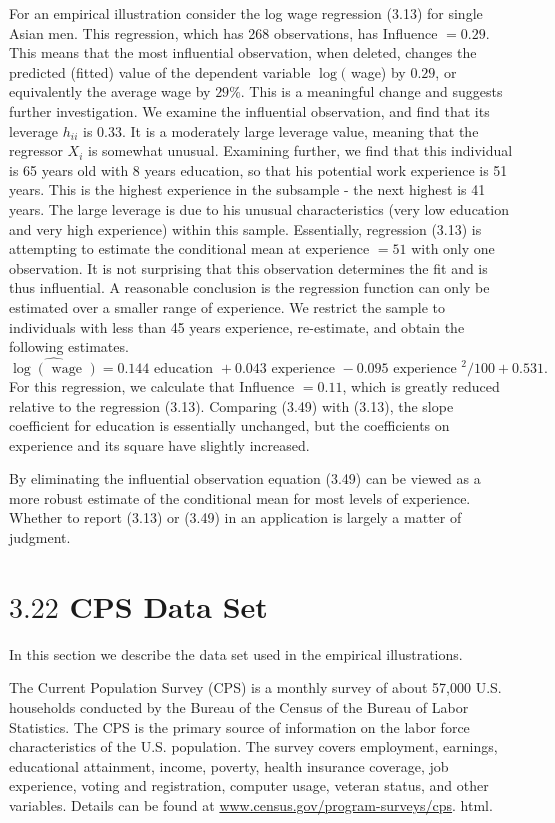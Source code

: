 \documentclass[10pt]{article}
\begin{document}
For an empirical illustration consider the log wage regression (3.13) for single Asian men. This regression, which has 268 observations, has Influence $=0.29$. This means that the most influential observation, when deleted, changes the predicted (fitted) value of the dependent variable $\log ($ wage) by $0.29$, or equivalently the average wage by $29 \%$. This is a meaningful change and suggests further investigation. We examine the influential observation, and find that its leverage $h_{i i}$ is $0.33$. It is a moderately large leverage value, meaning that the regressor $X_{i}$ is somewhat unusual. Examining further, we find that this individual is 65 years old with 8 years education, so that his potential work experience is 51 years. This is the highest experience in the subsample - the next highest is 41 years. The large leverage is due to his unusual characteristics (very low education and very high experience) within this sample. Essentially, regression (3.13) is attempting to estimate the conditional mean at experience $=51$ with only one observation. It is not surprising that this observation determines the fit and is thus influential. A reasonable conclusion is the regression function can only be estimated over a smaller range of experience. We restrict the sample to individuals with less than 45 years experience, re-estimate, and obtain the following estimates.
$$
\widehat{\log (\text { wage })}=0.144 \text { education }+0.043 \text { experience }-0.095 \text { experience }^{2} / 100+0.531 \text {. }
$$
For this regression, we calculate that Influence $=0.11$, which is greatly reduced relative to the regression (3.13). Comparing (3.49) with (3.13), the slope coefficient for education is essentially unchanged, but the coefficients on experience and its square have slightly increased.

By eliminating the influential observation equation (3.49) can be viewed as a more robust estimate of the conditional mean for most levels of experience. Whether to report (3.13) or (3.49) in an application is largely a matter of judgment.

\section{$3.22$ CPS Data Set}
In this section we describe the data set used in the empirical illustrations.

The Current Population Survey (CPS) is a monthly survey of about 57,000 U.S. households conducted by the Bureau of the Census of the Bureau of Labor Statistics. The CPS is the primary source of information on the labor force characteristics of the U.S. population. The survey covers employment, earnings, educational attainment, income, poverty, health insurance coverage, job experience, voting and registration, computer usage, veteran status, and other variables. Details can be found at \href{http://www.census.gov/program-surveys/cps}{www.census.gov/program-surveys/cps}. html.
\end{document}
